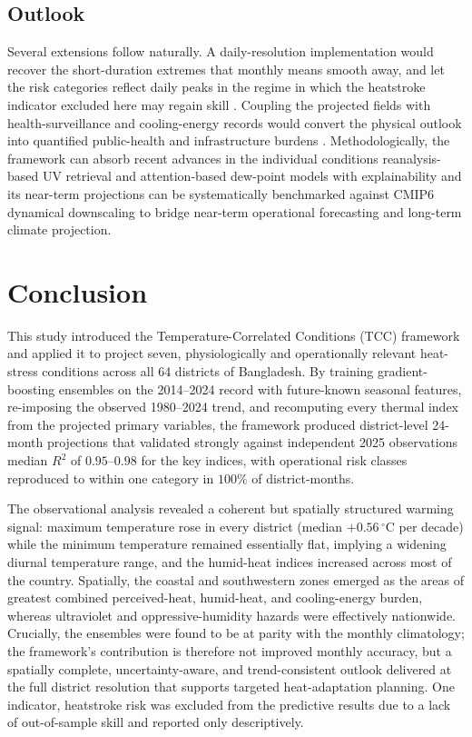 \documentclass[pdflatex,sn-basic,lineno]{sn-jnl}
\newcommand{\degC}{\ensuremath{^{\circ}\mathrm{C}}}
\begin{document}
\subsection{Outlook}
Several extensions follow naturally. A daily-resolution implementation would
recover the short-duration extremes that monthly means smooth away, and let the risk
categories reflect daily peaks in the regime in which the heatstroke indicator
excluded here may regain skill \citep{ehsan2026extremeheat}. Coupling the projected
fields with health-surveillance and cooling-energy records would convert the
physical outlook into quantified public-health and infrastructure burdens
\citep{miah2026}. Methodologically, the framework can absorb recent advances in the
individual conditions reanalysis-based UV retrieval \citep{teggi2026uvindex} and
attention-based dew-point models with explainability \citep{abdullah2025xai} and
its near-term projections can be systematically benchmarked against CMIP6 dynamical
downscaling \citep{khatun2024} to bridge near-term operational forecasting and
long-term climate projection.


\section{Conclusion}\label{sec:conclusion}
This study introduced the Temperature-Correlated Conditions (TCC) framework and
applied it to project seven, physiologically and operationally relevant heat-stress
conditions across all 64 districts of Bangladesh. By training gradient-boosting
ensembles on the 2014--2024 record with future-known seasonal features,
re-imposing the observed 1980--2024 trend, and recomputing every thermal index
from the projected primary variables, the framework produced district-level
24-month projections that validated strongly against independent 2025
observations median $R^{2}$ of $0.95$--$0.98$ for the key indices, with
operational risk classes reproduced to within one category in $100\%$ of
district-months.

The observational analysis revealed a coherent but spatially structured warming
signal: maximum temperature rose in every district (median $+0.56\,\degC$ per
decade) while the minimum temperature remained essentially flat, implying a widening
diurnal temperature range, and the humid-heat indices increased across most of the
country. Spatially, the coastal and southwestern zones emerged as the areas of
greatest combined perceived-heat, humid-heat, and cooling-energy burden, whereas
ultraviolet and oppressive-humidity hazards were effectively nationwide. Crucially,
the ensembles were found to be at parity with the monthly climatology; the framework's
contribution is therefore not improved monthly accuracy, but a spatially complete,
uncertainty-aware, and trend-consistent outlook delivered at the full district
resolution that supports targeted heat-adaptation planning. One indicator,
heatstroke risk was excluded from the predictive results due to a lack of
out-of-sample skill and reported only descriptively.
\end{document}
